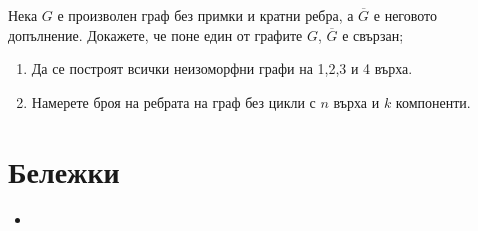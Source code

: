 \begin{problem}
  Нека $G$ е произволен граф без примки и кратни ребра, а $\overline{G}$ е неговото допълнение.
  Докажете, че поне един от графите $G$, $\overline{G}$ е свързан;
\end{problem}


\begin{problem}
  \begin{enumerate}
  \item
    Да се построят всички неизоморфни графи на 1,2,3 и 4 върха.
  \item
    Намерете броя на ребрата на граф без цикли с $n$ върха и $k$ компоненти.
  \end{enumerate}
\end{problem}


\section*{Бележки}

\begin{itemize}
\item 
  \cite{gavrilov}
\end{itemize}

